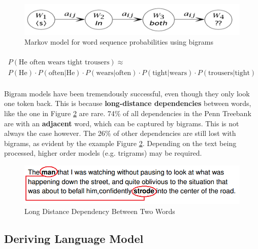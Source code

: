 \documentclass{article}
\begin{document}
\begin{figure}
	\centering
	\includegraphics[scale=0.5]{figures/bigram-chain.png}
	\caption{Markov model for word sequence probabilities using bigrams}
	\label{fig:bigram-model}
\end{figure}

\begin{multline}\\
	P(\text{He often wears tight trousers}) \approx \\
	P(\text{He}) \cdot P(\text{often$|$He}) \cdot P(\text{wears$|$often}) \cdot P(\text{tight$|$wears}) \cdot P(\text{trousers$|$tight})
	\label{eq:ngram-for-sentences}
\\\end{multline}

Bigram models have been tremendously successful, even though they only look one token back. This is because \textbf{long-distance dependencies} between words, like the one in Figure \ref{fig:long-distance-dependency} are rare. 74\% of all dependencies in the Penn Treebank are with an \textbf{adjacent} word, which can be captured by bigrams. This is not always the case however. The 26\% of other dependencies are still lost with bigrams, as evident by the example Figure \ref{fig:long-distance-dependency}. Depending on the text being processed, higher order models (e.g. trigrams) may be required.

\begin{figure}
	\centering
	\includegraphics[scale=0.5]{figures/long-distance-dependency.png}
	\caption{Long Distance Dependency Between Two Words}
	\label{fig:long-distance-dependency}
\end{figure}

\subsection{Deriving Language Model}
\end{document}
